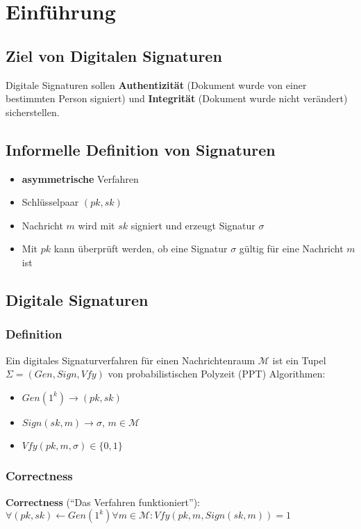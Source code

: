 \documentclass[12pt,A4]{extarticle}
\newcommand{\highlight}[1]{\textcolor{highlightColor}{\textbf{#1}}}
\begin{document}
\disclaimer

\tableofcontents
\clearpage

\section{Einführung}
\subsection{Ziel von Digitalen Signaturen}\label{sec:zielDigitaleSignaturen}
Digitale Signaturen sollen \highlight{Authentizität} (Dokument wurde von einer bestimmten Person signiert) und \highlight{Integrität} (Dokument wurde nicht verändert) sicherstellen.

\subsection{Informelle Definition von Signaturen}\label{sec:signaturenDefinition}
\begin{itemize}
  \item{\textbf{asymmetrische} Verfahren}
  \item{Schlüsselpaar $(pk, sk)$}
  \item{Nachricht $m$ wird mit $sk$ signiert und erzeugt Signatur $\sigma$}
  \item{Mit $pk$ kann überprüft werden, ob eine Signatur $\sigma$ gültig für eine Nachricht $m$ ist}
\end{itemize}

\subsection{Digitale Signaturen}
\subsubsection{Definition}
Ein digitales Signaturverfahren für einen Nachrichtenraum $\mathcal{M}$ ist ein Tupel $\Sigma = (Gen, Sign, Vfy)$ von probabilistischen Polyzeit (PPT) Algorithmen:
\begin{itemize}
  \item{$Gen(1^k) \rightarrow (pk, sk)$}
  \item{$Sign(sk, m) \rightarrow \sigma$, $m \in \mathcal{M}$}
  \item{$Vfy(pk, m, \sigma) \in \{0, 1\}$}
\end{itemize}

\subsubsection{Correctness}
\highlight{Correctness} (``Das Verfahren funktioniert''): $\forall (pk, sk) \leftarrow Gen(1^k) \forall m \in \mathcal{M}: Vfy(pk, m, Sign(sk, m)) = 1$
\end{document}
